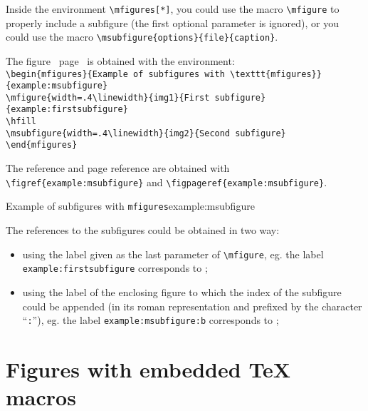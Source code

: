 \documentclass[book]{upmethodology-document}
\begin{document}
Inside the environment \texttt{{\textbackslash}mfigures[*]}, you could use the macro \texttt{{\textbackslash}mfigure} to properly include a subfigure (the first optional parameter is ignored), or you could use the macro \texttt{{\textbackslash}msubfigure\{options\}\{file\}\{caption\}}.

The figure~ page~ is obtained with the environment:\\
\texttt{{\textbackslash}begin\{mfigures\}\{Example of subfigures with {\textbackslash}texttt\{mfigures\}\}\{example:msubfigure\}}\\
\texttt{{\textbackslash}mfigure\{width=.4{\textbackslash}linewidth\}\{img1\}\{First subfigure\}\{example:firstsubfigure\}} \\
\texttt{{\textbackslash}hfill} \\
\texttt{{\textbackslash}msubfigure\{width=.4{\textbackslash}linewidth\}\{img2\}\{Second subfigure\}} \\
\texttt{{\textbackslash}end\{mfigures\}}

The reference and page reference are obtained with \texttt{{\textbackslash}figref\{example:msubfigure\}} and \texttt{{\textbackslash}figpageref\{example:msubfigure\}}.

\begin{mfigures}{Example of subfigures with \texttt{mfigures}}{example:msubfigure}
	\hfill
\end{mfigures}

The references to the subfigures could be obtained in two way:\nopagebreak\begin{itemize}
\item using the label given as the last parameter of \texttt{{\textbackslash}mfigure}, eg. the label \texttt{example:firstsubfigure} corresponds to ;
\item using the label of the enclosing figure to which the index of the subfigure could be appended (in its roman representation and prefixed by the character ``\texttt{:}''), eg. the label \texttt{example:msubfigure:b} corresponds to ;
\end{itemize}

\section{Figures with embedded \TeX\xspace macros}
\end{document}
